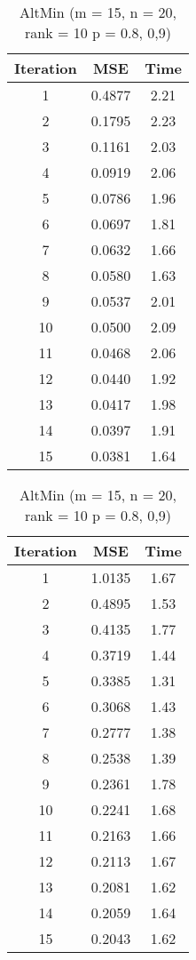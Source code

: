 \documentclass[oneside,final,14pt]{extreport} %
\begin{document}
\begin{table}[ht]
	\centering
	\begin{tabular}{|c|c|c|}
		\hline Iteration & MSE & Time \\ \hline
		1 & 0.4877 & 2.21 \\ \hline
		2 & 0.1795 & 2.23 \\ \hline
		3 & 0.1161 & 2.03 \\ \hline
		4 & 0.0919 & 2.06 \\ \hline
		5 & 0.0786 & 1.96 \\ \hline
		6 & 0.0697 & 1.81 \\ \hline
		7 & 0.0632 & 1.66 \\ \hline
		8 & 0.0580 & 1.63 \\ \hline
		9 & 0.0537 & 2.01 \\ \hline
		10 & 0.0500 & 2.09 \\ \hline
		11 & 0.0468 & 2.06 \\ \hline
		12 & 0.0440 & 1.92 \\ \hline
		13 & 0.0417 & 1.98 \\ \hline
		14 & 0.0397 & 1.91 \\ \hline
		15 & 0.0381 & 1.64 \\ \hline
	\end{tabular}
	\begin{tabular}{|c|c|c|}
		\hline Iteration & MSE & Time \\ \hline
		1 & 1.0135 & 1.67 \\ \hline
		2 & 0.4895 & 1.53 \\ \hline
		3 & 0.4135 & 1.77 \\ \hline
		4 & 0.3719 & 1.44 \\ \hline
		5 & 0.3385 & 1.31 \\ \hline
		6 & 0.3068 & 1.43 \\ \hline
		7 & 0.2777 & 1.38 \\ \hline
		8 & 0.2538 & 1.39 \\ \hline
		9 & 0.2361 & 1.78 \\ \hline
		10 & 0.2241 & 1.68 \\ \hline
		11 & 0.2163 & 1.66 \\ \hline
		12 & 0.2113 & 1.67 \\ \hline
		13 & 0.2081 & 1.62 \\ \hline
		14 & 0.2059 & 1.64 \\ \hline
		15 & 0.2043 & 1.62 \\ \hline
	\end{tabular}
	\caption{AltMin (m = 15, n = 20, rank = 10 p = 0.8, 0,9)}
	\label{exp12AM}
\end{table}
\end{document}
